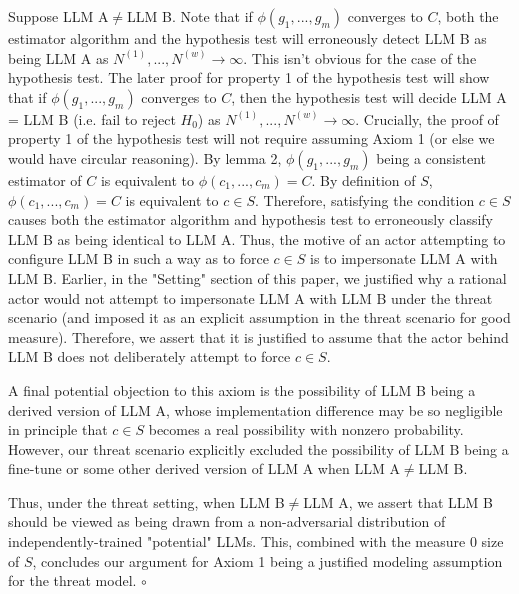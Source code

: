 \documentclass{article}
\begin{document}
Suppose LLM A$\displaystyle \neq $LLM B. Note that if $\displaystyle \phi \left( g_{1} ,...,g_{m}\right)$ converges to $\displaystyle C$, both the estimator algorithm and the hypothesis test will erroneously detect LLM B as being LLM A as $\displaystyle N^{\left( 1\right)} ,...,N^{\left( w\right)}\rightarrow \infty $. This isn't obvious for the case of the hypothesis test. The later proof for property 1 of the hypothesis test will show that if $\displaystyle \phi \left( g_{1} ,...,g_{m}\right)$ converges to $\displaystyle C$, then the hypothesis test will decide LLM A = LLM B (i.e. fail to reject $\displaystyle H_{0}$) as $\displaystyle N^{\left( 1\right)} ,...,N^{\left( w\right)}\rightarrow \infty $. Crucially, the proof of property 1 of the hypothesis test will not require assuming Axiom 1 (or else we would have circular reasoning). By lemma 2, $\displaystyle \phi \left( g_{1} ,...,g_{m}\right)$ being a consistent estimator of $\displaystyle C$ is equivalent to $\displaystyle \phi \left( c_{1} ,...,c_{m}\right) =C$. By definition of $\displaystyle S$, $\displaystyle \phi \left( c_{1} ,...,c_{m}\right) =C$ is equivalent to $\displaystyle c\in S$. Therefore, satisfying the condition $\displaystyle c\in S$ causes both the estimator algorithm and hypothesis test to erroneously classify LLM B as being identical to LLM A. Thus, the motive of an actor attempting to configure LLM B in such a way as to force $\displaystyle c\in S$ is to impersonate LLM A with LLM B. Earlier, in the "Setting" section of this paper, we justified why a rational actor would not attempt to impersonate LLM A with LLM B under the threat scenario (and imposed it as an explicit assumption in the threat scenario for good measure). Therefore, we assert that it is justified to assume that the actor behind LLM B does not deliberately attempt to force $\displaystyle c\in S$. 



A final potential objection to this axiom is the possibility of LLM B being a derived version of LLM A, whose implementation difference may be so negligible in principle that $\displaystyle c\in S$ becomes a real possibility with nonzero probability. However, our threat scenario explicitly excluded the possibility of LLM B being a fine-tune or some other derived version of LLM A when LLM A$\displaystyle \neq $LLM B.



Thus, under the threat setting, when LLM B$\displaystyle \neq $LLM A, we assert that LLM B should be viewed as being drawn from a non-adversarial distribution of independently-trained "potential" LLMs. This, combined with the measure 0 size of $\displaystyle S$, concludes our argument for Axiom 1 being a justified modeling assumption for the threat model. \(\circ\)
\end{document}
